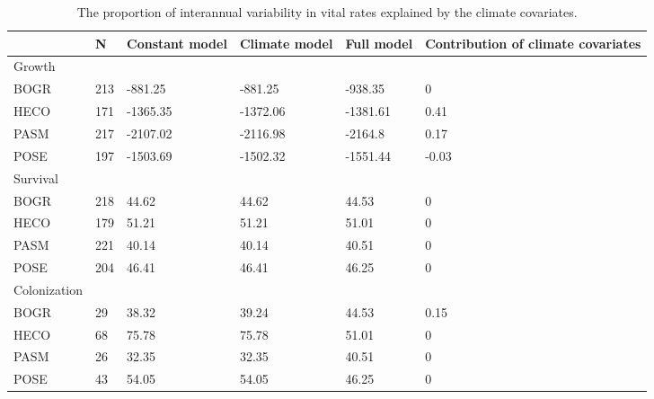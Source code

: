 \documentclass[12pt]{article}
\begin{document}
\begin{table}[ht]
\centering
\caption{The proportion of interannual variability in  vital rates explained by the climate covariates.} 
\begin{tabularx}{\textwidth}{lllllX}
  \hline
 & N & Constant model & Climate model & Full model & Contribution of climate covariates \\ 
  \hline
Growth &  &  &  &  &  \\ 
  BOGR & 213 & -881.25 & -881.25 & -938.35 & 0 \\ 
  HECO & 171 & -1365.35 & -1372.06 & -1381.61 & 0.41 \\ 
  PASM & 217 & -2107.02 & -2116.98 & -2164.8 & 0.17 \\ 
  POSE & 197 & -1503.69 & -1502.32 & -1551.44 & -0.03 \\ 
  Survival &  &  &  &  &  \\ 
  BOGR & 218 & 44.62 & 44.62 & 44.53 & 0 \\ 
  HECO & 179 & 51.21 & 51.21 & 51.01 & 0 \\ 
  PASM & 221 & 40.14 & 40.14 & 40.51 & 0 \\ 
  POSE & 204 & 46.41 & 46.41 & 46.25 & 0 \\ 
  Colonization &  &  &  &  &  \\ 
  BOGR & 29 & 38.32 & 39.24 & 44.53 & 0.15 \\ 
  HECO & 68 & 75.78 & 75.78 & 51.01 & 0 \\ 
  PASM & 26 & 32.35 & 32.35 & 40.51 & 0 \\ 
  POSE & 43 & 54.05 & 54.05 & 46.25 & 0 \\ 
   \hline
\end{tabularx}
\end{table}
\end{document}
